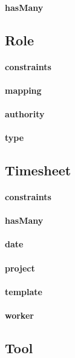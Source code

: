 \documentclass[12pt]{article}
\begin{document}
\paragraph{hasMany}

\setcounter{paragraph}{0}
\subsection{Role}\label{sec:DRole}
\paragraph{constraints}
\paragraph{mapping}
\paragraph{authority}
\paragraph{type}

\setcounter{paragraph}{0}
\subsection{Timesheet}\label{sec:DTimesheet}
\paragraph{constraints}
\paragraph{hasMany}
\paragraph{date}
\paragraph{project}
\paragraph{template}
\paragraph{worker}

\setcounter{paragraph}{0}
\subsection{Tool}\label{sec:DTool}
\end{document}
